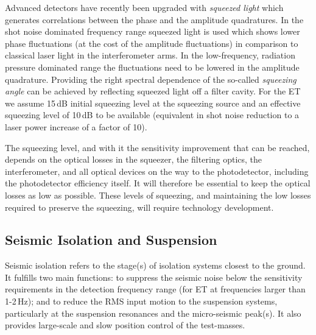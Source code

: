 Advanced detectors have recently been upgraded with \textit{squeezed light} which generates correlations between the phase and the amplitude quadratures. In the shot noise  dominated frequency range squeezed light is used which shows lower phase fluctuations (at the cost of the amplitude fluctuations) in comparison to classical  laser light in the interferometer arms. In the low-frequency, radiation pressure dominated range the fluctuations need to be lowered in the amplitude quadrature. 
Providing the right spectral dependence of the so-called \textit{squeezing angle} can be  achieved by reflecting squeezed light off a filter cavity. 
For the ET we assume 15\,dB initial squeezing level at the squeezing source and an effective squeezing level of 10\,dB to be 
available (equivalent in shot noise reduction to a laser power increase of a factor
of 10). 

The squeezing level, and with it the sensitivity improvement that can be reached, 
depends on the optical losses in the squeezer, the filtering optics, the interferometer, 
and all optical devices on the way to the photodetector, including the photodetector 
efficiency itself. It will therefore be essential 
to keep the optical losses as low as possible. 
These levels of squeezing, and maintaining the low losses required to preserve the squeezing, will require technology development.


\subsection{Seismic Isolation and Suspension}
\label{Sec:SASandSUS}


Seismic isolation refers to the stage(s) of isolation systems closest to the ground. It fulfills two main
functions: to suppress the seismic noise below the sensitivity requirements in the detection frequency range
(for ET at frequencies larger than 1-2\,Hz); and to reduce the RMS input motion to the suspension systems,
particularly at the suspension resonances and the micro-seismic peak(s). It also provides large-scale and
slow position control of the test-masses.

